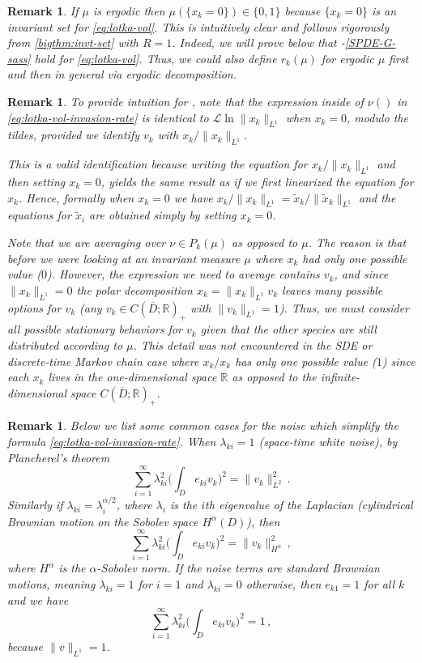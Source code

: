 \documentclass[final]{amsart}
\newtheorem{rem}[thm]{Remark}
\numberwithin{thm}{section}
\numberwithin{equation}{section}
\newcommand{\R}{\mathbb{R}}
\newcommand{\Ll}{\mathcal{L}}
\begin{document}
\begin{rem}
    If $\mu$ is ergodic then $\mu(\{x_k = 0\}) \in \{0,1\}$ because $\{x_k = 0\}$ is an invariant set for \eqref{eq:lotka-vol}. This is intuitively clear and follows rigorously from \ref{bigthm:invt-set} with $R=1$. Indeed, we will prove below that -\ref{SPDE-G-sass} hold for \eqref{eq:lotka-vol}. Thus, we could also define $r_k(\mu)$ for ergodic $\mu$ first and then in general via ergodic decomposition.
\end{rem}

\begin{rem}\label{rem:on-inv-rates}
    To provide intuition for , note that the expression inside of $\nu()$ in \eqref{eq:lotka-vol-invasion-rate} is identical to $\Ll \ln \|x_k\|_{L^1}$ when $x_k = 0$, modulo the tildes, provided we identify $v_k$ with $x_k/\|x_k\|_{L^1}$.
    
    This is a valid identification because  writing the equation for $x_k/\|x_k\|_{L^1}$ and then setting $x_k = 0$,  yields the same result as if we first linearized the equation for $x_k$. Hence, formally when $x_k = 0$ we have $x_k/\|x_k\|_{L^1} = \tilde x_k/\|\tilde x_k\|_{L^1}$ and the equations for $\tilde x_i$ are obtained simply by setting $x_k = 0$. 
    
    Note that we are averaging over $\nu \in P_k(\mu)$ as opposed to $\mu$. The reason is that before we were looking at an invariant measure $\mu$ where $x_k$ had only one possible value ($0$). However, the expression we need to average contains $v_k$, and since $\|x_k\|_{L^1} = 0$ the polar decomposition $x_k = \|x_k\|_{L^1}v_k$ leaves many possible options for $v_k$ (any $v_k \in C(\overline D;\R)_+$ with $\|v_k\|_{L^1} = 1$). Thus, we must consider all possible stationary behaviors for $v_k$ given that the other species are still distributed according to $\mu$. This detail was not encountered in the SDE or discrete-time Markov chain case where $x_k/x_k$ has only one possible value ($1$) since each $x_k$ lives in the one-dimensional space $\R$ as opposed to the infinite-dimensional space $C(\overline D;\R)_+$.
\end{rem}

\begin{rem}
Below we list some common cases for the noise which simplify the formula \eqref{eq:lotka-vol-invasion-rate}.
When $\lambda_{ki} = 1$ (space-time white noise), by Plancherel's theorem
$$
\sum_{i=1}^\infty \lambda_{ki}^2\Big(\int_D e_{ki} v_k\Big)^2 = \|v_k\|_{L^2}^2 \,.
$$  
Similarly if $\lambda_{ki} = \lambda_i^{\alpha/2}$,  where $\lambda_i$ is the $i$th eigenvalue of the Laplacian (cylindrical Brownian motion on the Sobolev space $H^\alpha(D)$),  then 
$$\sum_{i=1}^\infty \lambda_{ki}^2\Big(\int_D e_{ki} v_k\Big)^2 = \|v_k\|_{H^\alpha}^2 \,,
$$
where $H^\alpha$ is the $\alpha$-Sobolev norm. If the noise terms are standard Brownian motions, meaning $\lambda_{ki} = 1$ for $i = 1$ and $\lambda_{ki} = 0$ otherwise, then $e_{k1} = 1$ for all $k$ and 
we have 
$$
\sum_{i=1}^\infty \lambda_{ki}^2\Big(\int_D e_{ki} v_k\Big)^2 = 1 \,,
$$ 
because $\|v\|_{L^1} = 1$.
\end{rem}
\end{document}
